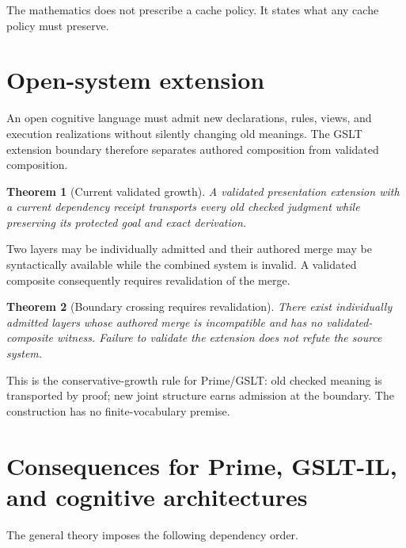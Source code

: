 \documentclass[11pt]{article}
\newtheorem{theorem}{Theorem}[section]
\begin{document}
The mathematics does not prescribe a cache policy.  It states what any cache policy
must preserve.

\section{Open-system extension}

An open cognitive language must admit new declarations, rules, views, and execution
realizations without silently changing old meanings.  The GSLT extension boundary
therefore separates authored composition from validated composition.

\begin{theorem}[Current validated growth]
A validated presentation extension with a current dependency receipt transports every
old checked judgment while preserving its protected goal and exact derivation.
\end{theorem}

Two layers may be individually admitted and their authored merge may be syntactically
available while the combined system is invalid.  A validated composite consequently
requires revalidation of the merge.

\begin{theorem}[Boundary crossing requires revalidation]
There exist individually admitted layers whose authored merge is incompatible and
has no validated-composite witness.  Failure to validate the extension does not refute
the source system.
\end{theorem}

This is the conservative-growth rule for Prime/GSLT: old checked meaning is transported
by proof; new joint structure earns admission at the boundary.  The construction has
no finite-vocabulary premise.

\section{Consequences for Prime, GSLT-IL, and cognitive architectures}

The general theory imposes the following dependency order.

\begin{center}
\end{center}
\end{document}
